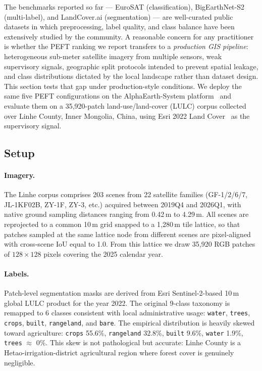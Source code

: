 \documentclass[11pt]{article}
\begin{document}
The benchmarks reported so far --- EuroSAT (classification), BigEarthNet-S2 (multi-label), and LandCover.ai (segmentation) --- are well-curated public datasets in which preprocessing, label quality, and class balance have been extensively studied by the community. A reasonable concern for any practitioner is whether the PEFT ranking we report transfers to a \emph{production GIS pipeline}: heterogeneous sub-meter satellite imagery from multiple sensors, weak supervisory signals, geographic split protocols intended to prevent spatial leakage, and class distributions dictated by the local landscape rather than dataset design. This section tests that gap under production-style conditions. We deploy the same five PEFT configurations on the AlphaEarth-System platform~\cite{alphaearth2026} and evaluate them on a 35{,}920-patch land-use/land-cover (LULC) corpus collected over Linhe County, Inner Mongolia, China, using Esri 2022 Land Cover~\cite{karra2022esri} as the supervisory signal.

\subsection{Setup}

\paragraph{Imagery.} The Linhe corpus comprises 203 scenes from 22 satellite families (GF-1/2/6/7, JL-1KF02B, ZY-1F, ZY-3, etc.) acquired between 2019Q4 and 2026Q1, with native ground sampling distances ranging from 0.42\,m to 4.29\,m. All scenes are reprojected to a common 10\,m grid snapped to a 1{,}280\,m tile lattice, so that patches sampled at the same lattice node from different scenes are pixel-aligned with cross-scene IoU equal to 1.0. From this lattice we draw 35{,}920 RGB patches of $128 \times 128$ pixels covering the 2025 calendar year.

\paragraph{Labels.} Patch-level segmentation masks are derived from Esri Sentinel-2-based 10\,m global LULC product for the year 2022. The original 9-class taxonomy is remapped to 6 classes consistent with local administrative usage: \texttt{water}, \texttt{trees}, \texttt{crops}, \texttt{built}, \texttt{rangeland}, and \texttt{bare}. The empirical distribution is heavily skewed toward agriculture: \texttt{crops} 55.6\%, \texttt{rangeland} 32.8\%, \texttt{built} 9.6\%, \texttt{water} 1.9\%, \texttt{trees} $\approx$ 0\%. This skew is not pathological but accurate: Linhe County is a Hetao-irrigation-district agricultural region where forest cover is genuinely negligible.
\end{document}

